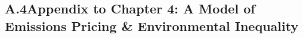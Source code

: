 




\newpage
\subsection*{A.4\quad Appendix to Chapter 4: A Model of Emissions Pricing \& Environmental Inequality}

